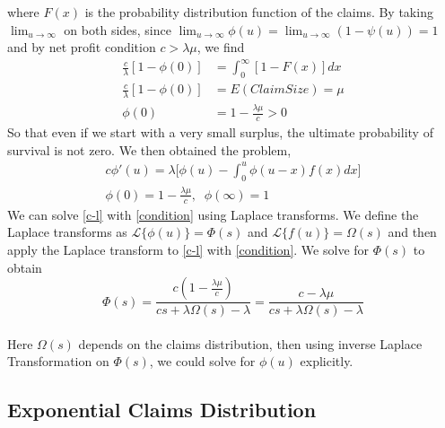 \documentclass[12pt]{article}
\begin{document}
where $F(x)$ is the probability distribution function of the claims.
By taking $\displaystyle\lim_{u\to \infty}$ on both sides, since $\displaystyle\lim_{u\to \infty}\phi(u)=\lim_{u\to \infty}(1-\psi(u))=1$ and by net profit condition \(c>\lambda\mu\), we find \\
\begin{align*}
    \frac{c}{\lambda}[1-\phi(0)]&=\int_{0}^{\infty}[1-F(x)]dx\\
    \frac{c}{\lambda}[1-\phi(0)]&=E(Claim Size)=\mu\\
    \phi(0)&=1-\frac{\lambda\mu}{c}>0
\end{align*}
So that even if we start with a very small surplus, the ultimate probability
of survival is not zero.
We then obtained the problem,
\begin{eqnarray}
\displaystyle c\phi'(u)=\lambda\Big[\phi(u)-\int_{0}^{u}\phi(u-x)f(x)dx\Big]
\label{c-l} \\
\displaystyle \phi(0)=1-\frac{\lambda\mu}{c}, \;\; \phi(\infty)=1
\label{condition}
\end{eqnarray} 
We can solve \eqref{c-l} with \eqref{condition} using Laplace transforms.  We
define the Laplace transforms as
 \(\mathcal{L}\{\phi(u)\}=\Phi(s)\) and \(\mathcal{L}\{f(u)\}=\Omega(s)\)
 and then apply the Laplace transform to \eqref{c-l} with \eqref{condition}.
We solve for $\Phi(s)$ to obtain
\begin{equation}\label{Lap-Tr}
    \Phi(s)=\frac{c(1-\frac{\lambda\mu}{c})}{cs+\lambda\Omega(s)-\lambda}=\frac{c-\lambda\mu}{cs+\lambda\Omega(s)-\lambda}
\end{equation}
\\
Here \(\Omega(s)\) depends on the claims distribution, then using inverse Laplace Transformation on \(\Phi(s)\), we could solve for \(\phi(u)\) explicitly.


\subsection{Exponential Claims Distribution}
\end{document}
